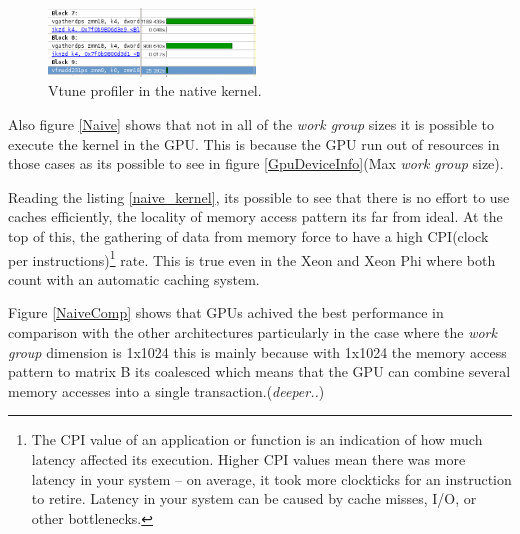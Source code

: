 \begin{figure}[!h]
    \centering
    \includegraphics[width=0.49\textwidth]{figures/vtune_naive.png}
    \caption{Vtune profiler in the native kernel.}
    \label{vtune_naive}
\end{figure}

\par{Also figure \ref{Naive} shows that not in all of the \emph{work group} sizes it is possible to execute the kernel in the GPU. 
This is because the GPU run out of resources in those cases\cite{opencl_error} as its possible to see in figure 
\ref{GpuDeviceInfo}(Max \emph{work group} size).}

\par{Reading the listing \ref{naive_kernel}, its possible to see that there is no effort to use caches efficiently, the locality of
    memory access pattern its far from ideal. At the top of this, the gathering of data from memory force to have a high CPI(clock per
    instructions)\footnote{The CPI value of an application or function is an indication of how much latency affected its execution. 
    Higher CPI values mean there was more latency in your system – on average, it took more clockticks for an instruction to retire. 
    Latency in your system can be caused by cache misses, I/O, or other bottlenecks\cite{cpi}.} 
    rate. This is true even in the Xeon and Xeon Phi where both count with an automatic caching system.}

\par{Figure \ref{NaiveComp} shows that GPUs achived the best performance in comparison with the other architectures particularly
    in the case where the \emph{work group} dimension is 1x1024 this is mainly because with 1x1024 the memory access pattern to 
    matrix B its coalesced which means that the GPU can combine several memory accesses into a single transaction.(\emph{deeper..})}


